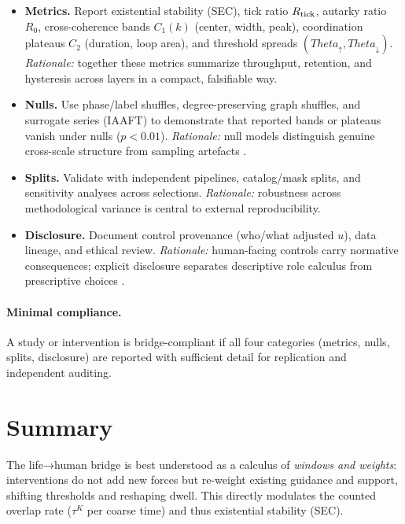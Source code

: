 \documentclass[12pt,a4paper,oneside]{scrreprt}
\def\Theta{Theta}%
\begin{document}
\begin{itemize}
  \item \textbf{Metrics.}  
  Report existential stability (SEC), tick ratio $R_{\rm tick}$, autarky ratio $R_0$, cross-coherence bands $C_1(k)$ (center, width, peak), coordination plateaus $C_2$ (duration, loop area), and threshold spreads $(\Theta_\uparrow,\Theta_\downarrow)$.  
  \emph{Rationale:} together these metrics summarize throughput, retention, and hysteresis across layers in a compact, falsifiable way.

  \item \textbf{Nulls.}  
  Use phase/label shuffles, degree-preserving graph shuffles, and surrogate series (IAAFT) to demonstrate that reported bands or plateaus vanish under nulls ($p<0.01$).  
  \emph{Rationale:} null models distinguish genuine cross-scale structure from sampling artefacts \cite{Theiler1992, Nichols2002}.

  \item \textbf{Splits.}  
  Validate with independent pipelines, catalog/mask splits, and sensitivity analyses across selections.  
  \emph{Rationale:} robustness across methodological variance is central to external reproducibility.

  \item \textbf{Disclosure.}  
  Document control provenance (who/what adjusted $u$), data lineage, and ethical review.  
  \emph{Rationale:} human-facing controls carry normative consequences; explicit disclosure separates descriptive role calculus from prescriptive choices \cite{Floridi2018}.
\end{itemize}

\paragraph{Minimal compliance.}  
A study or intervention is bridge-compliant if all four categories (metrics, nulls, splits, disclosure) are reported with sufficient detail for replication and independent auditing.


\section*{Summary}
The life→human bridge is best understood as a calculus of \emph{windows and weights}: 
interventions do not add new forces but re-weight existing guidance and support, shifting thresholds and reshaping dwell. 
This directly modulates the counted overlap rate ($\tau^K$ per coarse time) and thus existential stability (SEC). 
\end{document}
